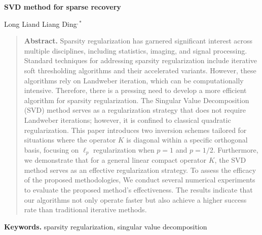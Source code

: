 \documentclass[a4paper,12pt]{article}
\numberwithin{equation}{section}
\begin{document}
\begin{center}
\Large\bf SVD method for sparse recovery
\end{center}

\begin{center}
Long Li\footnotemark[1] \quad and \quad Liang Ding\footnotemark[2]$^{,*}$


\renewcommand{\thefootnote}{\fnsymbol{footnote}}
\renewcommand{\thefootnote}{\arabic{footnote}}
\end{center}

\medskip
\begin{quote}
{\bf Abstract.} Sparsity regularization has garnered significant interest across multiple disciplines, including statistics, imaging, and signal processing. Standard techniques for addressing sparsity regularization include iterative soft thresholding algorithms and their accelerated variants. However, these algorithms rely on Landweber iteration, which can be computationally intensive. Therefore, there is a pressing need to develop a more efficient algorithm for sparsity regularization. The Singular Value Decomposition (SVD) method serves as a regularization strategy that does not require Landweber iterations; however, it is confined to classical quadratic regularization.  This paper introduces two inversion schemes tailored for situations where the operator $K$ is diagonal within a specific orthogonal basis, focusing on $\ell_{p}$ regularization when $p=1$ and $p=1/2$. Furthermore, we demonstrate that for a general linear compact operator $K$, the SVD method serves as an effective regularization strategy. To assess the efficacy of the proposed methodologies, We conduct several numerical experiments to evaluate the proposed method's effectiveness. The results indicate that our algorithms not only operate faster but also achieve a higher success rate than traditional iterative methods.
\end{quote}

\smallskip
{\bf Keywords.}  sparsity regularization, singular value decomposition
\end{document}
